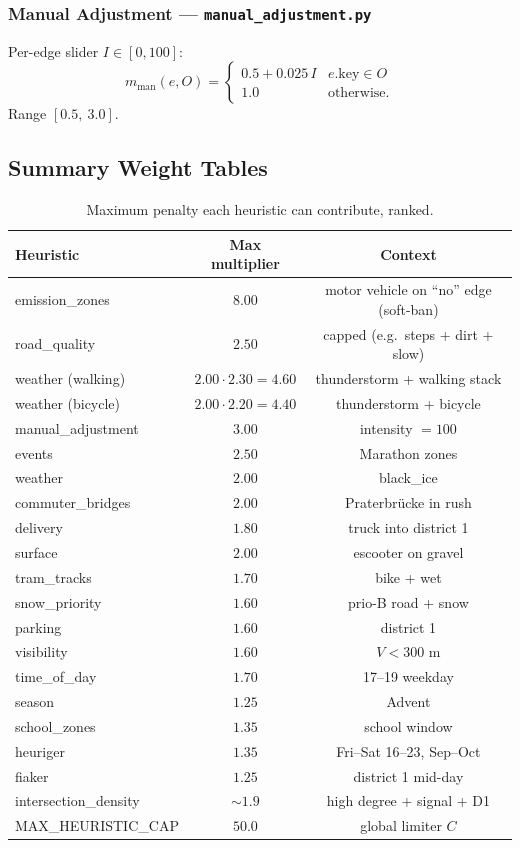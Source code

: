 \documentclass[12pt,a4paper]{article}
\begin{document}
\subsubsection{Manual Adjustment — \texttt{manual\_adjustment.py}} Per-edge slider $I\in[0,100]$:
\[
m_{\text{man}}(e,O) = \begin{cases} 0.5 + 0.025\,I & e.\text{key} \in O \\ 1.0 & \text{otherwise.} \end{cases}
\]
Range $[0.5,\ 3.0]$.

\subsection{Summary Weight Tables}

\begin{table}[H]
\centering\small
\caption{Maximum penalty each heuristic can contribute, ranked.}
\begin{tabular}{lcc}
\toprule
Heuristic & Max multiplier & Context \\\midrule
emission\_zones      & $8.00$ & motor vehicle on ``no'' edge (soft-ban) \\
road\_quality        & $2.50$ & capped (e.g.\ steps + dirt + slow) \\
weather (walking)    & $2.00\cdot 2.30 = 4.60$ & thunderstorm + walking stack \\
weather (bicycle)    & $2.00\cdot 2.20 = 4.40$ & thunderstorm + bicycle \\
manual\_adjustment   & $3.00$ & intensity $=100$ \\
events               & $2.50$ & Marathon zones \\
weather              & $2.00$ & black\_ice \\
commuter\_bridges    & $2.00$ & Praterbrücke in rush \\
delivery             & $1.80$ & truck into district 1 \\
surface              & $2.00$ & escooter on gravel \\
tram\_tracks         & $1.70$ & bike + wet \\
snow\_priority       & $1.60$ & prio-B road + snow \\
parking              & $1.60$ & district 1 \\
visibility           & $1.60$ & $V<300$ m \\
time\_of\_day        & $1.70$ & 17–19 weekday \\
season               & $1.25$ & Advent \\
school\_zones        & $1.35$ & school window \\
heuriger             & $1.35$ & Fri–Sat 16–23, Sep–Oct \\
fiaker               & $1.25$ & district 1 mid-day \\
intersection\_density & $\sim 1.9$ & high degree + signal + D1 \\
MAX\_HEURISTIC\_CAP  & $50.0$ & global limiter $C$ \\\bottomrule
\end{tabular}
\end{table}
\end{document}
